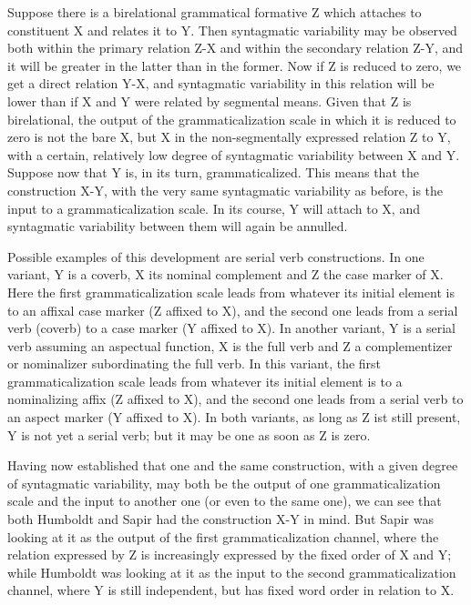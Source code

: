 Suppose there is a birelational grammatical formative Z which attaches to constituent X and relates it to Y. Then syntagmatic variability may be observed both within the primary relation Z-X and within the secondary relation Z-Y, and it will be greater in the latter than in the former. Now if Z is reduced to zero, we get a direct relation Y-X, and syntagmatic variability in this relation will be lower than if X and Y were related by segmental means. Given that Z is birelational, the output of the grammaticalization scale in which it is reduced to zero is not the bare X, but X in the non-segmentally expressed relation Z to Y, with a certain, relatively low degree of syntagmatic variability between X and Y. Suppose now that Y is, in its turn, grammaticalized. This means that the construction X-Y, with the very same syntagmatic variability as before, is the input to a grammaticalization scale. In its course, Y will attach to X, and syntagmatic variability between them will again be annulled.

Possible examples of this development are serial verb constructions. In one variant, Y is a coverb, X its nominal complement and Z the case marker of X. Here the first grammaticalization scale leads from whatever its initial element is to an affixal case marker (Z affixed to X), and the second one leads from a serial verb (coverb) to a case marker (Y affixed to X). In another variant, Y is a serial verb assuming an aspectual function, X is the full verb and Z a complementizer or nominalizer subordinating the full verb. In this variant, the first grammaticalization scale leads from whatever its initial element is to a nominalizing affix (Z affixed to X), and the second one leads from a serial verb to an aspect marker (Y affixed to X). In both variants, as long as Z ist still present, Y is not yet a serial verb; but it may be one as soon as Z is zero.

Having now established that one and the same construction, with a given degree of syntagmatic variability, may both be the output of one grammaticalization scale and the input to another one (or even to the same one), we can see that both Humboldt and Sapir had the construction X-Y in mind. But Sapir was looking at it as the output of the first grammaticalization channel, where the relation expressed by Z is increasingly expressed by the fixed order of X and Y; while Humboldt was looking at it as the input to the second grammaticalization channel, where Y is still independent, but has fixed word order in relation to X.

